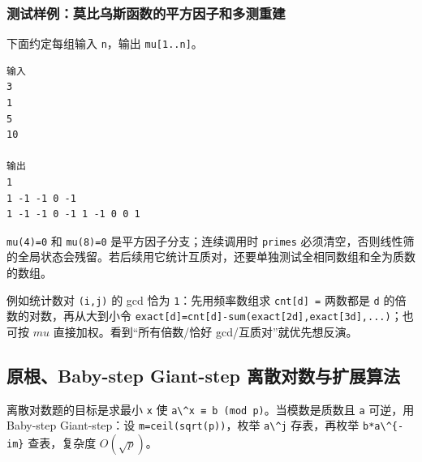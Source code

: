 \subsubsection{测试样例：莫比乌斯函数的平方因子和多测重建}

下面约定每组输入 \passthrough{\lstinline!n!}，输出 \passthrough{\lstinline!mu[1..n]!}。

\begin{lstlisting}
输入
3
1
5
10

输出
1
1 -1 -1 0 -1
1 -1 -1 0 -1 1 -1 0 0 1
\end{lstlisting}

\passthrough{\lstinline!mu(4)=0!} 和 \passthrough{\lstinline!mu(8)=0!} 是平方因子分支；连续调用时 \passthrough{\lstinline!primes!} 必须清空，否则线性筛的全局状态会残留。若后续用它统计互质对，还要单独测试全相同数组和全为质数的数组。

例如统计数对 \passthrough{\lstinline!(i,j)!} 的 gcd 恰为 \passthrough{\lstinline!1!}：先用频率数组求 \passthrough{\lstinline!cnt[d] =!} 两数都是 \passthrough{\lstinline!d!} 的倍数的对数，再从大到小令 \passthrough{\lstinline!exact[d]=cnt[d]-sum(exact[2d],exact[3d],...)!}；也可按 \(mu\) 直接加权。看到``所有倍数/恰好 gcd/互质对''就优先想反演。


\subsection{原根、Baby-step Giant-step 离散对数与扩展算法}

离散对数题的目标是求最小 \passthrough{\lstinline!x!} 使 \passthrough{\lstinline!a\^x ≡ b (mod p)!}。当模数是质数且 \passthrough{\lstinline!a!} 可逆，用 Baby-step Giant-step：设 \passthrough{\lstinline!m=ceil(sqrt(p))!}，枚举 \passthrough{\lstinline!a\^j!} 存表，再枚举 \passthrough{\lstinline!b*a\^\{-im\}!} 查表，复杂度 \(O(\sqrt p)\)。


